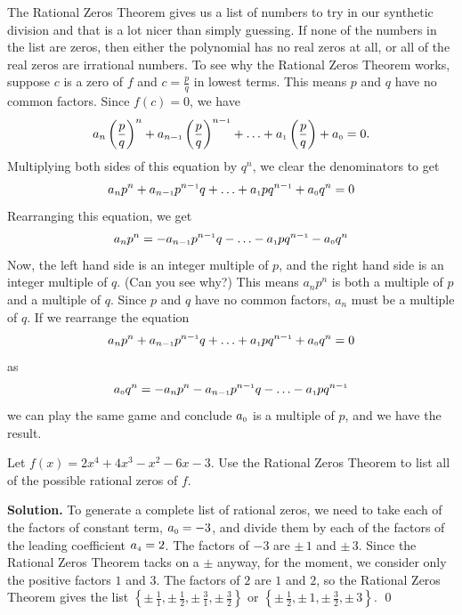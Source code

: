 The Rational Zeros Theorem gives us a list of numbers to try in our synthetic division and that is a lot nicer than simply guessing.  If none of the numbers in the list are zeros, then either the polynomial has no real zeros at all, or all of the real zeros are irrational numbers.  To see why the Rational Zeros Theorem works, suppose $c$ is a zero of $f$ and $c = \frac{p}{q}$ in lowest terms.  This means $p$ and $q$ have no common factors.  Since $f(c) = 0$, we have \[a_{n} \left(\frac{p}{q}\right)^{n} + a_{n-\mbox{\tiny$1$}}\left(\frac{p}{q}\right)^{n-\mbox{\tiny$1$}} + \ldots + a_{\mbox{\tiny$1$}} \left(\frac{p}{q}\right) + a_{\mbox{\tiny$0$}} = 0.\]  Multiplying both sides of this equation by $q^n$, we clear the denominators to get \[a_{n}p^{n} + a_{n-\mbox{\tiny$1$}}p^{n-\mbox{\tiny$1$}}q + \ldots + a_{\mbox{\tiny$1$}}p q^{n-\mbox{\tiny$1$}} + a_{\mbox{\tiny$0$}}q^n = 0\]  Rearranging this equation, we get  \[a_{n}p^{n} = -a_{n-\mbox{\tiny$1$}}p^{n-\mbox{\tiny$1$}}q - \ldots - a_{\mbox{\tiny$1$}}p q^{n-\mbox{\tiny$1$}} -a_{\mbox{\tiny$0$}}q^n\] Now, the left hand side is an integer multiple of $p$, and the right hand side is an integer multiple of $q$. (Can you see why?)  This means $a_{n}p^{n}$ is both a multiple of $p$ and a multiple of $q$.  Since $p$ and $q$ have no common factors, $a_{n}$ must be a multiple of $q$.  If we rearrange the equation \[a_{n}p^{n} + a_{n-\mbox{\tiny$1$}}p^{n-\mbox{\tiny$1$}}q + \ldots + a_{\mbox{\tiny$1$}}p q^{n-\mbox{\tiny$1$}} + a_{\mbox{\tiny$0$}}q^n = 0\] as \[a_{\mbox{\tiny$0$}}q^n = -a_{n}p^{n} - a_{n-\mbox{\tiny$1$}}p^{n-\mbox{\tiny$1$}}q - \ldots - a_{\mbox{\tiny$1$}}p q^{n-\mbox{\tiny$1$}}\] we can play the same game and conclude $a_{\mbox{\tiny$0$}}$ is a multiple of $p$, and we have the result.

\begin{ex}  Let $f(x) = 2x^4+4x^3-x^2-6x-3$. Use the Rational Zeros Theorem to list all of the possible rational zeros of $f$.

\smallskip

{\bf Solution.}  To generate a complete list of rational zeros, we need to take each of the factors of constant term, $a_{\mbox{\tiny$0$}} = -3$, and divide them by each of the factors of the leading coefficient $a_{\mbox{\tiny$4$}} = 2$.  The factors of $-3$ are $\pm \, 1$ and $\pm \, 3$.  Since the Rational Zeros Theorem tacks on a $\pm$ anyway, for the moment, we consider only the positive factors $1$ and $3$.  The factors of $2$ are  $1$ and $2$, so the Rational Zeros Theorem gives the list $\left\{\pm \, \frac{1}{1}, \pm \, \frac{1}{2},  \pm \, \frac{3}{1}, \pm \, \frac{3}{2}\right\}$ or $\left\{\pm \, \frac{1}{2}, \pm \, 1, \pm \, \frac{3}{2}, \pm \, 3\right\}$. \qed
\label{RZTex}
\end{ex}

